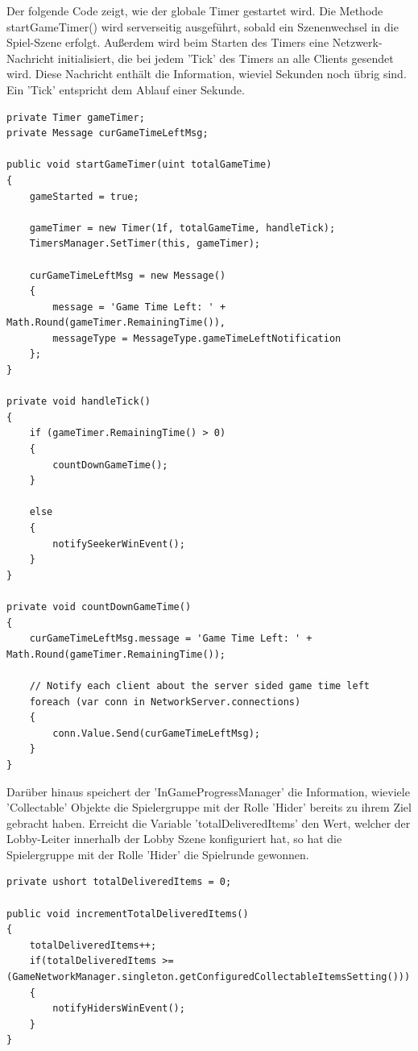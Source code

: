 Der folgende Code zeigt, wie der globale Timer gestartet wird. Die Methode startGameTimer() wird serverseitig ausgeführt, sobald ein Szenenwechsel in die Spiel-Szene erfolgt. Außerdem wird beim Starten des Timers eine Netzwerk-Nachricht initialisiert, die bei jedem 'Tick' des Timers an alle Clients gesendet wird. Diese Nachricht enthält die Information, wieviel Sekunden noch übrig sind. Ein 'Tick' entspricht dem Ablauf einer Sekunde.

\begin{lstlisting}[caption= InGameProgressManager.cs global Game Time Handling]
private Timer gameTimer;
private Message curGameTimeLeftMsg;

public void startGameTimer(uint totalGameTime)
{
	gameStarted = true;
	
	gameTimer = new Timer(1f, totalGameTime, handleTick);
	TimersManager.SetTimer(this, gameTimer);
	
	curGameTimeLeftMsg = new Message()
	{
		message = 'Game Time Left: ' + Math.Round(gameTimer.RemainingTime()),
		messageType = MessageType.gameTimeLeftNotification
	};
}

private void handleTick()
{
	if (gameTimer.RemainingTime() > 0)
	{
		countDownGameTime();
	}
	
	else
	{
		notifySeekerWinEvent();
	}
}

private void countDownGameTime()
{
	curGameTimeLeftMsg.message = 'Game Time Left: ' + Math.Round(gameTimer.RemainingTime());
	
	// Notify each client about the server sided game time left
	foreach (var conn in NetworkServer.connections)
	{
		conn.Value.Send(curGameTimeLeftMsg);
	}
}
\end{lstlisting}

Darüber hinaus speichert der 'InGameProgressManager' die Information, wieviele 'Collectable' Objekte die Spielergruppe mit der Rolle 'Hider' bereits zu ihrem Ziel gebracht haben. Erreicht die Variable 'totalDeliveredItems' den Wert, welcher der Lobby-Leiter innerhalb der Lobby Szene konfiguriert hat, so hat die Spielergruppe mit der Rolle 'Hider' die Spielrunde gewonnen.

\begin{lstlisting}[caption= InGameProgressManager.cs Item Devlivery Handling]
private ushort totalDeliveredItems = 0;

public void incrementTotalDeliveredItems()
{
	totalDeliveredItems++;
	if(totalDeliveredItems >= (GameNetworkManager.singleton.getConfiguredCollectableItemsSetting()))
	{
		notifyHidersWinEvent();
	}
}	
\end{lstlisting}

